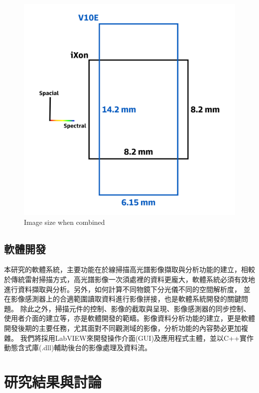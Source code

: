 \documentclass[12pt]{article}
\begin{document}
\begin{figure}[h]
    \centering
    \includegraphics[width=0.5\linewidth]{imagesize.jpg}
    \caption{Image size when combined}
    \label{figure: image size}
\end{figure}

\subsection{軟體開發} \label{software}
本研究的軟體系統，主要功能在於線掃描高光譜影像擷取與分析功能的建立，相較於傳統雷射掃描方式，高光譜影像一次須處裡的資料更龐大，軟體系統必須有效地進行資料擷取與分析。另外，如何計算不同物鏡下分光儀不同的空間解析度，
並在影像感測器上的合適範圍讀取資料進行影像拼接，也是軟體系統開發的關鍵問題。
除此之外，掃描元件的控制、影像的截取與呈現、影像感測器的同步控制、使用者介面的建立等，亦是軟體開發的範疇。影像資料分析功能的建立，更是軟體開發後期的主要任務，尤其面對不同觀測域的影像，分析功能的內容勢必更加複雜。
我們將採用LabVIEW來開發操作介面(GUI)及應用程式主體，並以C++實作動態含式庫(.dll)輔助後台的影像處理及資料流。

\section{研究結果與討論}
\end{document}
